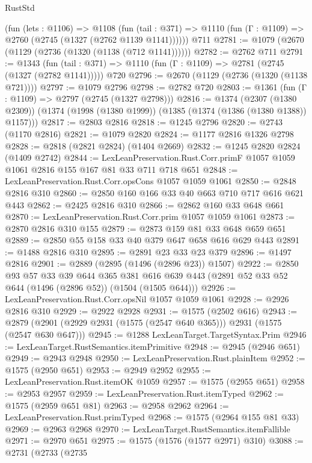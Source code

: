 \begin{lexlean}{RustStd}
\begin{coremodule}
{\begin{coremodule}
{{{{{{{{{{    (fun (lets : @1106) =>
    @1108
      (fun (tail : @371) => @1110 (fun (Γ : @1109) => @2760 (@2745 (@1327 (@2762 @1139 @1141))))))
    @711
@2781 := @1079 (@2670 (@1129 (@2736 (@1320 (@1138 (@712 @1141))))))
@2782 := @2762 @711
@2791 := @1343
    (fun (tail : @371) => @1110 (fun (Γ : @1109) => @2781 (@2745 (@1327 (@2782 @1141)))))
    @720
@2796 := @2670 (@1129 (@2736 (@1320 (@1138 @721))))
@2797 := @1079 @2796
@2798 := @2782 @720
@2803 := @1361 (fun (Γ : @1109) => @2797 (@2745 (@1327 @2798)))
@2816 := @1374
    (@2307 (@1380 @2309))
    (@1374 (@1998 (@1380 @1999)) (@1385 (@1374 (@1386 (@1380 @1388)) @1157)))
@2817 := @2803 @2816
@2818 := @1245 @2796
@2820 := @2743 (@1170 @2816)
@2821 := @1079 @2820
@2824 := @1177 @2816 @1326 @2798
@2828 := @2818 (@2821 @2824) (@1404 @2669)
@2832 := @1245 @2820 @2824 (@1409 @2742)
@2844 := LexLeanPreservation.Rust.Corr.primF
    @1057
    @1059
    @1061
    @2816
    @155
    @167
    @81
    @33
    @711
    @718
    @651
@2848 := LexLeanPreservation.Rust.Corr.opsCons @1057 @1059 @1061
@2850 := @2848 @2816 @310
@2860 := @2850 @160 @166 @33 @40 @663 @710 @717 @616 @621 @443
@2862 := @2425 @2816 @310
@2866 := @2862 @160 @33 @648 @661
@2870 := LexLeanPreservation.Rust.Corr.prim @1057 @1059 @1061
@2873 := @2870 @2816 @310 @155
@2879 := @2873 @159 @81 @33 @648 @659 @651
@2889 := @2850 @55 @158 @33 @40 @379 @647 @658 @616 @629 @443
@2891 := @1488 @2816 @310
@2895 := @2891 @23 @33 @23 @379
@2896 := @1497 @2816
@2901 := @2889 (@2895 (@1496 (@2896 @23)) @1507)
@2922 := @2850
    @93
    @57
    @33
    @39
    @644
    @365
    @381
    @616
    @639
    @443
    (@2891 @52 @33 @52 @644 (@1496 (@2896 @52)) (@1504 (@1505 @644)))
@2926 := LexLeanPreservation.Rust.Corr.opsNil @1057 @1059 @1061
@2928 := @2926 @2816 @310
@2929 := @2922 @2928
@2931 := @1575 (@2502 @616)
@2943 := @2879 (@2901 (@2929 @2931 (@1575 (@2547 @640 @365))) @2931 (@1575 (@2547 @630 @647)))
@2945 := @1288 LexLeanTarget.TargetSyntax.Prim
@2946 := LexLeanTarget.RustSemantics.itemPrimitive
@2948 := @2945 (@2946 @651)
@2949 := @2943 @2948
@2950 := LexLeanPreservation.Rust.plainItem
@2952 := @1575 (@2950 @651)
@2953 := @2949 @2952
@2955 := LexLeanPreservation.Rust.itemOK @1059
@2957 := @1575 (@2955 @651)
@2958 := @2953 @2957
@2959 := LexLeanPreservation.Rust.itemTyped
@2962 := @1575 (@2959 @651 @81)
@2963 := @2958 @2962
@2964 := LexLeanPreservation.Rust.primTyped
@2968 := @1575 (@2964 @155 @81 @33)
@2969 := @2963 @2968
@2970 := LexLeanTarget.RustSemantics.itemFallible
@2971 := @2970 @651
@2975 := @1575 (@1576 (@1577 @2971) @310)
@3088 := @2731
    (@2733
      (@2735
}}}}}}}}}}
\end{coremodule}}
\end{coremodule}
\end{lexlean}
